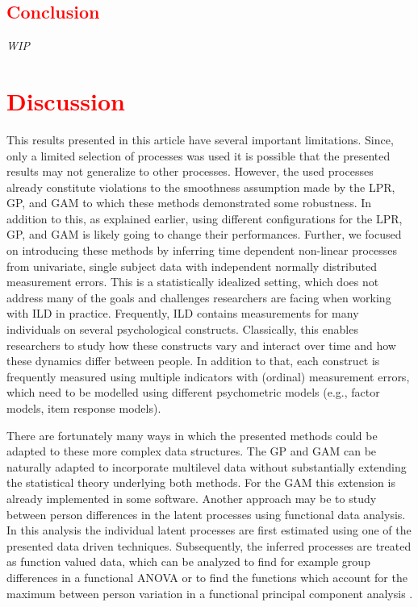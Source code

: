 \documentclass[man, floatsintext]{apa7}
\begin{document}
\subsection{\textcolor{red}{Conclusion}}

\textit{WIP}

\section{\textcolor{red}{Discussion}}

This results presented in this article have several important limitations.
Since, only a limited selection of processes was used it is possible that the
presented results may not generalize to other processes. However, the used
processes already constitute violations to the smoothness assumption made by
the LPR, GP, and GAM to which these methods demonstrated some robustness. In
addition to this, as explained earlier, using different configurations for the
LPR, GP, and GAM is likely going to change their performances. Further, we
focused on introducing these methods by inferring time dependent non-linear
processes from univariate, single subject data with independent normally
distributed measurement errors. This is a statistically idealized setting,
which does not address many of the goals and challenges researchers are facing
when working with ILD in practice. Frequently, ILD contains measurements for
many individuals on several psychological constructs. Classically, this enables
researchers to study how these constructs vary and interact over time and how
these dynamics differ between people. In addition to that, each construct is
frequently measured using multiple indicators with (ordinal) measurement
errors, which need to be modelled using different psychometric models (e.g.,
factor models, item response models).

There are fortunately many ways in which the presented methods could be adapted
to these more complex data structures. The GP and GAM can be naturally adapted
to incorporate multilevel data without substantially extending the statistical
theory underlying both methods. For the GAM this extension is already
implemented in some software. Another approach may be to study between person
differences in the latent processes using functional data analysis. In this
analysis the individual latent processes are first estimated using one of the
presented data driven techniques. Subsequently, the inferred processes are
treated as function valued data, which can be analyzed to find for example
group differences in a functional ANOVA \parencite{kaufman_bayesian_2010} or to
find the functions which account for the maximum between person variation in a
functional principal component analysis \parencite{aue_prediction_2015}.
\end{document}
